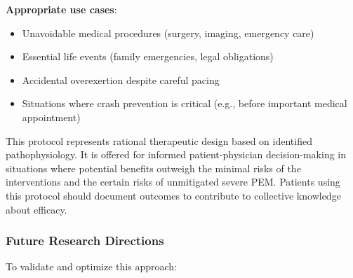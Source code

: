 \begin{warning}
\textbf{Appropriate use cases}:
\begin{itemize}
    \item Unavoidable medical procedures (surgery, imaging, emergency care)
    \item Essential life events (family emergencies, legal obligations)
    \item Accidental overexertion despite careful pacing
    \item Situations where crash prevention is critical (e.g., before important medical appointment)
\end{itemize}

This protocol represents rational therapeutic design based on identified pathophysiology. It is offered for informed patient-physician decision-making in situations where potential benefits outweigh the minimal risks of the interventions and the certain risks of unmitigated severe PEM. Patients using this protocol should document outcomes to contribute to collective knowledge about efficacy.
\end{warning}

\subsubsection{Future Research Directions}

To validate and optimize this approach:

